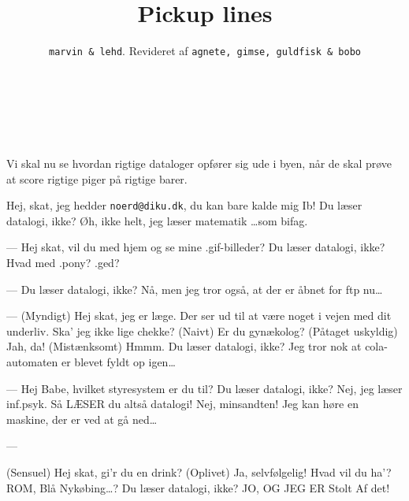 \documentclass[10pt]{article}
\title{Pickup lines}
\author{{\tt marvin \& lehd}. Revideret af {\tt agnete, gimse, guldfisk \& bobo}}
\begin{document}
\maketitle

\begin{sketch}

\begin{roles}
   ~
   ~
   ~
   ~
  \end{roles}

\begin{props}
   ~
\end{props}

 Vi skal nu se hvordan rigtige dataloger opfører sig ude
i byen, når de skal prøve at score rigtige piger på rigtige barer.

Hej, skat, jeg hedder {\tt noerd@diku.dk}, du kan bare kalde mig Ib!
Du læser datalogi, ikke?
Øh, ikke helt, jeg læser matematik \ldots som bifag. 

---
Hej skat, vil du med hjem og se mine .gif-billeder?
Du læser datalogi, ikke?
Hvad med .pony? .ged?

---
Du læser datalogi, ikke?
Nå, men jeg tror også, at der er åbnet for ftp nu\ldots
{}

---
(Myndigt) Hej skat, jeg er læge. Der ser ud til at være noget i vejen
med dit underliv. Ska' jeg ikke lige chekke?
(Naivt) Er du gynækolog?
(Påtaget uskyldig) Jah, da!
(Mistænksomt) Hmmm. Du læser datalogi, ikke?
Jeg tror nok at cola-automaten er blevet fyldt op igen\ldots
{}

---
Hej Babe, hvilket styresystem er du til?
Du læser datalogi, ikke?
Nej, jeg læser inf.psyk.
Så LÆSER du altså datalogi!
Nej, minsandten! Jeg kan høre en maskine, der er ved at
gå ned\ldots
{}

---

(Sensuel) Hej skat, gi'r du en drink?
(Oplivet) 
 Ja, selvfølgelig! Hvad vil du ha'? ROM, Blå Nykøbing\ldots ?
Du læser datalogi, ikke?
JO, OG JEG ER Stolt Af det!


\end{sketch}
\end{document}
